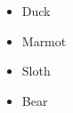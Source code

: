 \documentclass{beamer}
\begin{document}
\begin{frame}
\begin{itemize}[<+>]
\item Duck
\item Marmot
\item Sloth
\item Bear
\end{itemize}
\end{frame}
\end{document}
